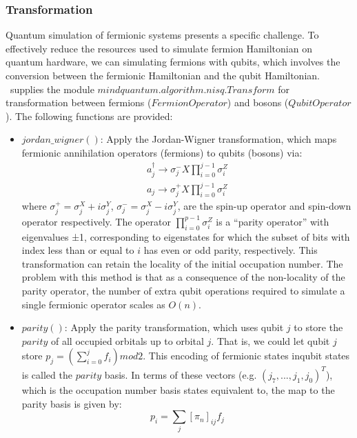 \subsubsection{Transformation}
Quantum simulation of fermionic systems presents a specific challenge. To effectively reduce the resources used to simulate fermion Hamiltonian on quantum hardware, we can simulating fermions with qubits, which involves the conversion between the fermionic Hamiltonian and the qubit Hamiltonian. \MindQuantum\ supplies the module $mindquantum.algorithm.nisq.Transform$ for transformation between fermions ($FermionOperator$) and bosons ($QubitOperator$). The following functions are provided: 
\begin{itemize}
    \item $jordan\_wigner()$: Apply the Jordan-Wigner transformation, which maps fermionic annihilation operators (fermions) to qubits (bosons) via: 
    \begin{equation}
        \begin{split}
        a_j^{\dagger} \to {\sigma}_j^{-} X \prod_{i=0}^{j-1} {\sigma}^Z_i \\
        a_j \to {\sigma}_j^{+} X \prod_{i=0}^{j-1} {\sigma}^Z_i
        \end{split}
    \end{equation}
    where ${\sigma}_j^{+} = {\sigma}_j^X+i{\sigma}_j^Y$, ${\sigma}_j^{-} = {\sigma}_j^X-i{\sigma}_j^Y$, are the spin-up operator and spin-down operator respectively. The operator $\prod_{i=0}^{p-1} {{\sigma}^Z_i}$ is a “parity operator” with eigenvalues ±1, corresponding to eigenstates for which the subset of bits with index less than or equal to $i$ has even or odd parity, respectively. This transformation can retain the locality of the initial occupation number. The problem with this method is that as a consequence of the non-locality of the parity operator, the number of extra qubit operations required to simulate a single fermionic operator scales as $O(n)$. 
    \item $parity()$: Apply the parity transformation, which uses qubit $j$ to store the $parity$ of all occupied orbitals up to orbital $j$. That is, we could let qubit $j$ store $p_j = (\sum_{i=0}^j f_i) mod 2$. This encoding of fermionic states inqubit states is called the $parity$ basis. In terms of these vectors (e.g. $(j_7,...,j_1,j_0)^T$), which is the occupation number basis states equivalent to, the map to the parity basis is given by: 
    \begin{equation}
        p_i = \sum_j {[\pi_n]_{ij} f_j}

\end{equation}
\end{itemize}
